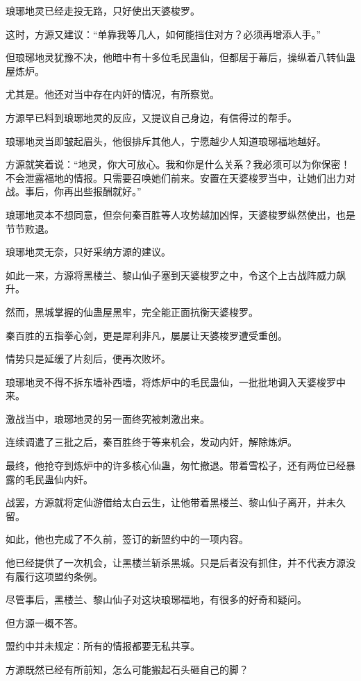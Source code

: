 \begin{this_body}
琅琊地灵已经走投无路，只好使出天婆梭罗。

这时，方源又建议：“单靠我等几人，如何能挡住对方？必须再增添人手。”

但琅琊地灵犹豫不决，他暗中有十多位毛民蛊仙，但都居于幕后，操纵着八转仙蛊屋炼炉。

尤其是。他还对当中存在内奸的情况，有所察觉。

方源早已料到琅琊地灵的反应，又提议自己身边，有信得过的帮手。

琅琊地灵当即皱起眉头，他很排斥其他人，宁愿越少人知道琅琊福地越好。

方源就笑着说：“地灵，你大可放心。我和你是什么关系？我必须可以为你保密！不会泄露福地的情报。只需要召唤她们前来。安置在天婆梭罗当中，让她们出力对战。事后，你再出些报酬就好。”

琅琊地灵本不想同意，但奈何秦百胜等人攻势越加凶悍，天婆梭罗纵然使出，也是节节败退。

琅琊地灵无奈，只好采纳方源的建议。

如此一来，方源将黑楼兰、黎山仙子塞到天婆梭罗之中，令这个上古战阵威力飙升。

然而，黑城掌握的仙蛊屋黑牢，完全能正面抗衡天婆梭罗。

秦百胜的五指拳心剑，更是犀利非凡，屡屡让天婆梭罗遭受重创。

情势只是延缓了片刻后，便再次败坏。

琅琊地灵不得不拆东墙补西墙，将炼炉中的毛民蛊仙，一批批地调入天婆梭罗中来。

激战当中，琅琊地灵的另一面终究被刺激出来。

连续调遣了三批之后，秦百胜终于等来机会，发动内奸，解除炼炉。

最终，他抢夺到炼炉中的许多核心仙蛊，匆忙撤退。带着雪松子，还有两位已经暴露的毛民蛊仙内奸。

战罢，方源就将定仙游借给太白云生，让他带着黑楼兰、黎山仙子离开，并未久留。

如此，他也完成了不久前，签订的新盟约中的一项内容。

他已经提供了一次机会，让黑楼兰斩杀黑城。只是后者没有抓住，并不代表方源没有履行这项盟约条例。

尽管事后，黑楼兰、黎山仙子对这块琅琊福地，有很多的好奇和疑问。

但方源一概不答。

盟约中并未规定：所有的情报都要无私共享。

方源既然已经有所前知，怎么可能搬起石头砸自己的脚？


\end{this_body}
